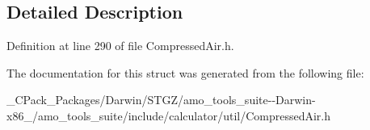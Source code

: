 \subsection{Detailed Description}


Definition at line 290 of file Compressed\+Air.\+h.



The documentation for this struct was generated from the following file\+:\begin{DoxyCompactItemize}
\item 
\+\_\+\+C\+Pack\+\_\+\+Packages/\+Darwin/\+S\+T\+G\+Z/amo\+\_\+tools\+\_\+suite-\/-\/\+Darwin-\/x86\+\_/amo\+\_\+tools\+\_\+suite/include/calculator/util/Compressed\+Air.\+h\end{DoxyCompactItemize}
